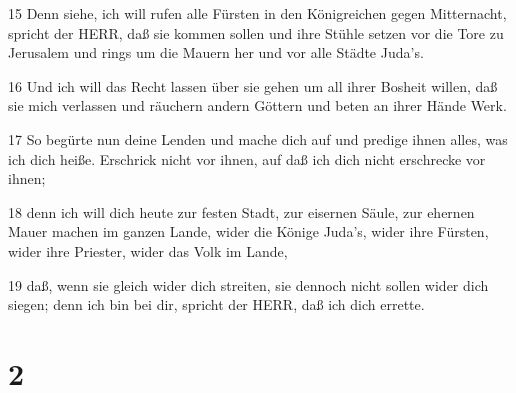 \par 15 Denn siehe, ich will rufen alle Fürsten in den Königreichen gegen Mitternacht, spricht der HERR, daß sie kommen sollen und ihre Stühle setzen vor die Tore zu Jerusalem und rings um die Mauern her und vor alle Städte Juda's.
\par 16 Und ich will das Recht lassen über sie gehen um all ihrer Bosheit willen, daß sie mich verlassen und räuchern andern Göttern und beten an ihrer Hände Werk.
\par 17 So begürte nun deine Lenden und mache dich auf und predige ihnen alles, was ich dich heiße. Erschrick nicht vor ihnen, auf daß ich dich nicht erschrecke vor ihnen;
\par 18 denn ich will dich heute zur festen Stadt, zur eisernen Säule, zur ehernen Mauer machen im ganzen Lande, wider die Könige Juda's, wider ihre Fürsten, wider ihre Priester, wider das Volk im Lande,
\par 19 daß, wenn sie gleich wider dich streiten, sie dennoch nicht sollen wider dich siegen; denn ich bin bei dir, spricht der HERR, daß ich dich errette.

\chapter{2}

